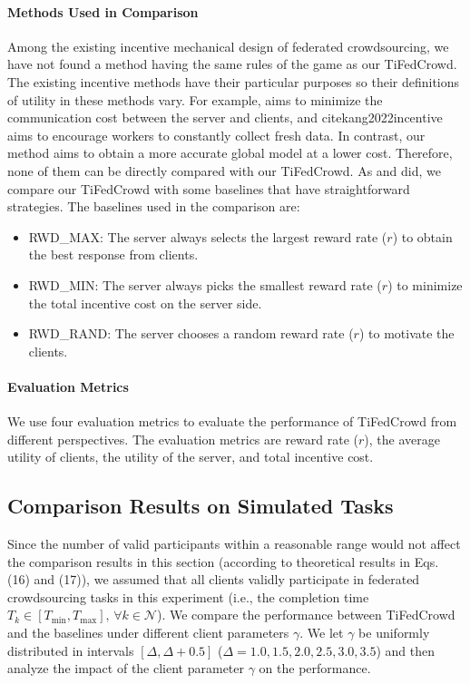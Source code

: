 \documentclass[final,1p,times]{elsarticle}
\begin{document}
\paragraph{\textbf{Methods Used in Comparison}}
Among the existing incentive mechanical design of federated crowdsourcing, we have not found a method having the same rules of the game as our TiFedCrowd. The existing incentive methods have their particular purposes so their definitions of utility in these methods vary. For example,  \cite{pandey2019incentivize} aims to minimize the communication cost between the server and clients, and cite{kang2022incentive} aims to encourage workers to constantly collect fresh data. In contrast, our method aims to obtain a more accurate global model at a lower cost. Therefore, none of them can be directly compared with our TiFedCrowd. As \cite{pandey2019incentivize} and \cite{kang2022incentive} did, we compare our TiFedCrowd with some baselines that have straightforward strategies. The baselines used in the comparison are:
\begin{itemize}
	\item RWD\_MAX: The server always selects the largest reward rate ($r$) to obtain the best response from clients.  
	\item RWD\_MIN: The server always picks the smallest reward rate ($r$) to minimize the total incentive cost on the server side.
	\item RWD\_RAND: The server chooses a random reward rate ($r$) to motivate the clients.
\end{itemize}

\paragraph{\textbf{Evaluation Metrics}}
We use four evaluation metrics to evaluate the performance of TiFedCrowd from different perspectives. The evaluation metrics are reward rate ($r$), the average utility of clients, the utility of the server, and total incentive cost.

\subsection{Comparison Results on Simulated Tasks} \label{PCWB}
Since the number of valid participants within a reasonable range would not affect the comparison results in this section (according to theoretical results in Eqs. (16) and (17)), we assumed that all clients validly participate in federated crowdsourcing tasks in this experiment (i.e., the completion time $T_k\in[T_{\min},T_{\max}],\,\forall k\in\bm{\mathcal{N}}$). We compare the performance between TiFedCrowd and the baselines under different client parameters $\gamma$. We let $\gamma$ be uniformly distributed in intervals $[\Delta, \Delta + 0.5]$ ($\Delta = 1.0, 1.5, 2.0, 2.5, 3.0, 3.5$) and then analyze the impact of the client parameter $\gamma$ on the performance.
\end{document}
